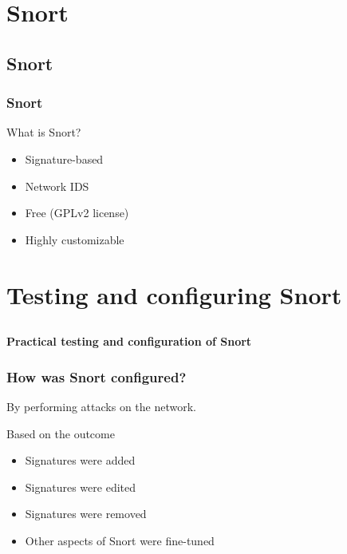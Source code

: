 \documentclass{beamer}
\begin{document}
\section{Snort}
\subsection*{Snort}

\begin{frame}
\frametitle{Snort}
\begin{block}{What is Snort?}
	\begin{itemize}
	\item Signature-based
	\item Network IDS
	\item Free (GPLv2 license)
	\item Highly customizable
	\end{itemize}
\end{block}
\end{frame}
\section{Testing and configuring Snort}
\subsection*{}

\begin{frame}
\frametitle{\insertsection}
\textbf{Practical testing and configuration of Snort}
\end{frame}

\begin{frame}
\frametitle{How was Snort configured?}
By performing attacks on the network.
\begin{block}{Based on the outcome}
	\begin{itemize}
	\item Signatures were added
	\item Signatures were edited
	\item Signatures were removed
	\item Other aspects of Snort were fine-tuned
	\end{itemize}
\end{block}
\end{frame}
\end{document}
